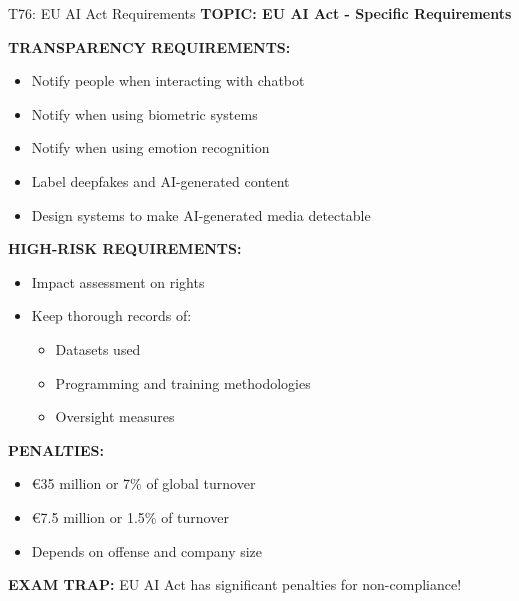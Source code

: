 \documentclass[8pt]{beamer}
\begin{document}
	\begin{frame}{T76: EU AI Act Requirements}
		\fontsize{6.5}{7.5}\selectfont
		\textbf{TOPIC: EU AI Act - Specific Requirements}
		
		\vspace{0.1cm}
		\textbf{TRANSPARENCY REQUIREMENTS:}
		\begin{itemize}
			\item Notify people when interacting with chatbot
			\item Notify when using biometric systems
			\item Notify when using emotion recognition
			\item Label deepfakes and AI-generated content
			\item Design systems to make AI-generated media detectable
		\end{itemize}
		
		\vspace{0.1cm}
		\textbf{HIGH-RISK REQUIREMENTS:}
		\begin{itemize}
			\item Impact assessment on rights
			\item Keep thorough records of:
			\begin{itemize}
				\item Datasets used
				\item Programming and training methodologies
				\item Oversight measures
			\end{itemize}
		\end{itemize}
		
		\vspace{0.1cm}
		\textbf{PENALTIES:}
		\begin{itemize}
			\item €35 million or 7\% of global turnover
			\item €7.5 million or 1.5\% of turnover
			\item Depends on offense and company size
		\end{itemize}
		
		\textcolor{myred}{\textbf{EXAM TRAP:}} EU AI Act has \textcolor{myblue}{significant penalties} for non-compliance!
	\end{frame}
	
\end{document}
